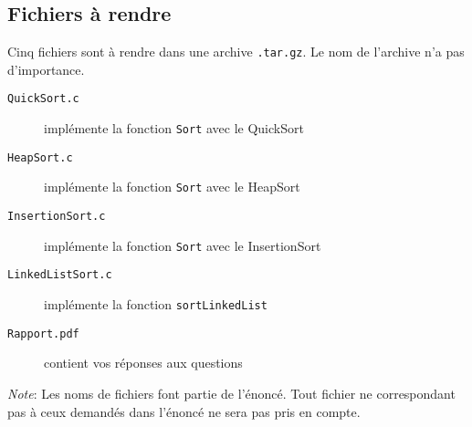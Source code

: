 \documentclass[a4paper,10pt]{article}
\begin{document}
\subsection*{Fichiers à rendre}
Cinq fichiers sont à rendre dans une archive \texttt{.tar.gz}. Le nom de l'archive n'a pas d'importance.
\begin{description}
\item[\texttt{QuickSort.c}] implémente la fonction \texttt{Sort} avec le QuickSort
\item[\texttt{HeapSort.c}] implémente la fonction \texttt{Sort} avec le HeapSort
\item[\texttt{InsertionSort.c}] implémente la fonction \texttt{Sort} avec le InsertionSort
\item[\texttt{LinkedListSort.c}] implémente la fonction \texttt{sortLinkedList}
\item[\texttt{Rapport.pdf}] contient vos réponses aux questions
\end{description}

{\em Note}: Les noms de fichiers font partie de l'énoncé. Tout fichier ne
correspondant pas à ceux demandés dans l'énoncé ne sera pas pris en compte.
\end{document}
